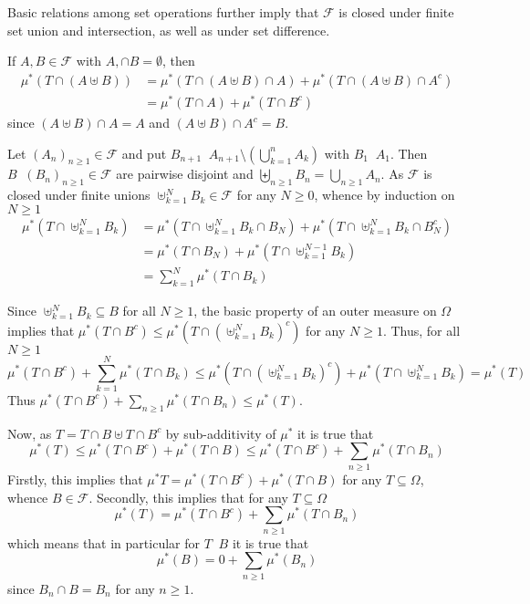 \documentclass[a4paper]{article}
\newcommand{\brac}[1]{\left ( #1 \right )}
\newcommand{\Fcal}{\mathcal{F}}
\newcommand{\defn}{\mathop{\overset{\Delta}{=}}\nolimits}
\begin{document}
Basic relations among set operations further imply that $\Fcal$ is closed under finite set union and intersection, as well as under set difference.

If $A,B\in \Fcal$ with $A,\cap B=\emptyset$, then \begin{align*}\mu^\ast\brac{T\cap \brac{A\uplus B}} &= \mu^\ast\brac{T\cap \brac{A\uplus B}\cap A} + \mu^\ast\brac{T\cap \brac{A\uplus B}\cap A^c}\\ &= \mu^\ast\brac{T\cap A} + \mu^\ast\brac{T\cap B^c}\end{align*} since $\brac{A\uplus B}\cap A = A$ and $\brac{A\uplus B}\cap A^c = B$.

Let $\brac{A_n}_{n\geq1}\in \Fcal$ and put $B_{n+1}\defn A_{n+1}\setminus\brac{ \bigcup_{k=1}^n A_k}$ with $B_1\defn A_1$. Then $B\defn \brac{B_n}_{n\geq1}\in \Fcal$ are pairwise disjoint and $\biguplus_{n\geq1} B_n = \bigcup_{n\geq1} A_n$. As $\Fcal$ is closed under finite unions $\uplus_{k=1}^N B_k\in \Fcal$ for any $N\geq0$, whence by induction on $N\geq1$ \begin{align*}\mu^\ast\brac{T\cap \uplus_{k=1}^N B_k} &= \mu^\ast\brac{T\cap \uplus_{k=1}^N B_k\cap B_N} + \mu^\ast\brac{T\cap \uplus_{k=1}^N B_k\cap B_N^c}\\&=\mu^\ast\brac{T\cap B_N} + \mu^\ast\brac{T\cap \uplus_{k=1}^{N-1} B_k}\\&=\sum_{k=1}^N \mu^\ast\brac{T\cap B_k}\end{align*}

Since $\uplus_{k=1}^N B_k\subseteq B$ for all $N\geq1$, the basic property of an outer measure on $\Omega$ implies that $\mu^\ast\brac{T\cap B^c}\leq \mu^\ast\brac{T\cap \brac{\uplus_{k=1}^N B_k}^c}$ for any $N\geq1$. Thus, for all $N\geq1$\[\mu^\ast\brac{T\cap B^c} + \sum_{k=1}^N \mu^\ast\brac{T\cap B_k}\leq \mu^\ast\brac{T\cap \brac{\uplus_{k=1}^N B_k}^c} + \mu^\ast\brac{T\cap \uplus_{k=1}^N B_k} = \mu^\ast\brac{T}\] Thus $\mu^\ast\brac{T\cap B^c} + \sum_{n\geq1} \mu^\ast\brac{T\cap B_n}\leq \mu^\ast\brac{T}$.

Now, as $T=T\cap B\uplus T\cap B^c$ by sub-additivity of $\mu^\ast$ it is true that \[\mu^\ast\brac{T}\leq \mu^\ast\brac{T\cap B^c}+\mu^\ast\brac{T\cap B}\leq\mu^\ast\brac{T\cap B^c}+\sum_{n\geq1}\mu^\ast\brac{T\cap B_n}\] Firstly, this implies that $\mu^\ast{T}=\mu^\ast\brac{T\cap B^c}+\mu^\ast\brac{T\cap B}$ for any $T\subseteq\Omega$, whence $B\in \Fcal$. Secondly, this implies that for any $T\subseteq \Omega$ \[\mu^\ast\brac{T} = \mu^\ast\brac{T\cap B^c} + \sum_{n\geq1} \mu^\ast\brac{T\cap B_n}\] which means that in particular for $T\defn B$ it is true that \[\mu^\ast\brac{B}=0+\sum_{n\geq1} \mu^\ast\brac{B_n}\] since $B_n\cap B=B_n$ for any $n\geq1$.
\end{document}
